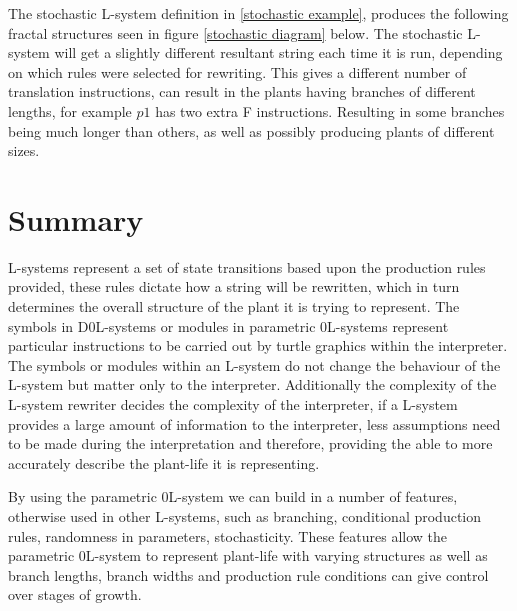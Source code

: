 \begin{flushleft}
\FloatBarrier

The stochastic L-system definition in \ref{stochastic example}, produces the following fractal structures seen in figure \ref{stochastic diagram} below. The stochastic L-system will get a slightly different resultant string each time it is run, depending on which rules were selected for rewriting. This gives a different number of translation instructions, can result in the plants having branches of different lengths, for example $p1$ has two extra F instructions. Resulting in some branches being much longer than others, as well as possibly producing plants of different sizes.\\   


\end{flushleft}

\section{Summary}

\begin{flushleft}

L-systems represent a set of state transitions based upon the production rules provided, these rules dictate how a string will be rewritten, which in turn determines the overall structure of the plant it is trying to represent. The symbols in D0L-systems or modules in parametric 0L-systems represent particular instructions to be carried out by turtle graphics within the interpreter. The symbols or modules within an L-system do not change the behaviour of the L-system but matter only to the interpreter. Additionally the complexity of the L-system rewriter decides the complexity of the interpreter, if a L-system provides a large amount of information to the interpreter, less assumptions need to be made during the interpretation and therefore, providing the able to more accurately describe the plant-life it is representing. \\

\vspace{5mm}

By using the parametric 0L-system we can build in a number of features, otherwise used in other L-systems, such as branching, conditional production rules, randomness in parameters, stochasticity. These features allow the parametric 0L-system to represent plant-life with varying structures as well as branch lengths, branch widths and production rule conditions can give control over stages of growth. \\ 

\end{flushleft}


